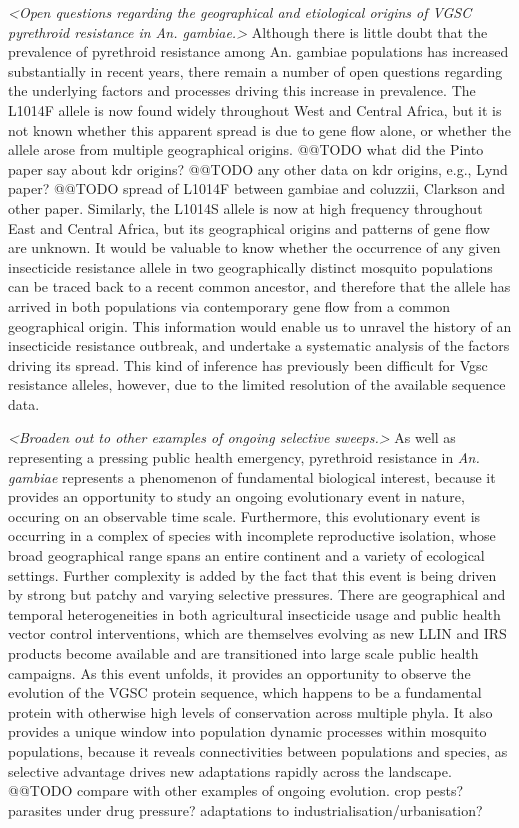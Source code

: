 \documentclass[a4paper,11pt,abstracton,hidelinks]{scrartcl}
\begin{document}
\textit{<Open questions regarding the geographical and etiological origins of VGSC pyrethroid resistance in An. gambiae.>}
%
Although there is little doubt that the prevalence of pyrethroid resistance among An. gambiae populations has increased substantially in recent years, there remain a number of open questions regarding the underlying factors and processes driving this increase in prevalence.
%
The L1014F allele is now found widely throughout West and Central Africa, but it is not known whether this apparent spread is due to gene flow alone, or whether the allele arose from multiple geographical origins.
%
@@TODO what did the Pinto paper say about kdr origins? @@TODO any other data on kdr origins, e.g., Lynd paper?
%
@@TODO spread of L1014F between gambiae and coluzzii, Clarkson and other paper.
%
Similarly, the L1014S allele is now at high frequency throughout East and Central Africa, but its geographical origins and patterns of gene flow are unknown.
%
It would be valuable to know whether the occurrence of any given insecticide resistance allele in two geographically distinct mosquito populations can be traced back to a recent common ancestor, and therefore that the allele has arrived in both populations via contemporary gene flow from a common geographical origin.
%
This information would enable us to unravel the history of an insecticide resistance outbreak, and undertake a systematic analysis of the factors driving its spread.
%
This kind of inference has previously been difficult for Vgsc resistance alleles, however, due to the limited resolution of the available sequence data.


\textit{<Broaden out to other examples of ongoing selective sweeps.>}
%
As well as representing a pressing public health emergency, pyrethroid resistance in \textit{An. gambiae} represents a phenomenon of fundamental biological interest, because it provides an opportunity to study an ongoing evolutionary event in nature, occuring on an observable time scale.
%
Furthermore, this evolutionary event is occurring in a complex of species with incomplete reproductive isolation, whose broad geographical range spans an entire continent and a variety of ecological settings.
%
Further complexity is added by the fact that this event is being driven by strong but patchy and varying selective pressures.
%
There are geographical and temporal heterogeneities in both agricultural insecticide usage and public health vector control interventions, which are themselves evolving as new LLIN and IRS products become available and are transitioned into large scale public health campaigns.
%
As this event unfolds, it provides an opportunity to observe the evolution of the VGSC protein sequence, which happens to be a fundamental protein with otherwise high levels of conservation across multiple phyla.
%
It also provides a unique window into population dynamic processes within mosquito populations, because it reveals connectivities between populations and species, as selective advantage drives new adaptations rapidly across the landscape.
%
@@TODO compare with other examples of ongoing evolution. crop pests? parasites under drug pressure? adaptations to industrialisation/urbanisation?
\end{document}
